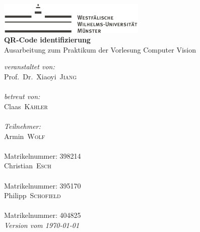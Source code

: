 
\begin{titlepage}
\begin{center}
\includegraphics[height=1.5cm, keepaspectratio]{images/Logo_WWU_Muenster.pdf} \\[1.0cm]
{\huge\sffamily\bfseries QR-Code identifizierung}\\[0.5cm]
{\large Ausarbeitung zum Praktikum der Vorlesung  Computer Vision}\\[3.0cm]
\end{center}

\begin{minipage}[b]{0.5\textwidth}
	{\large \textit{veranstaltet von:}}\\[5pt]
	{\Large Prof.\ Dr.\ Xiaoyi\ \textsc{Jiang}}\\[4pt]
	{}\\[.5cm] 

	{\large \textit{betreut von:}}\\[5pt]
	{\Large Claas\ \textsc{Kähler}}\\[4pt]
	{}\\[0.5cm] 

	{\large \textit{Teilnehmer:}}\\[5pt]
	{\Large Armin\ \textsc{Wolf}}\\[4pt]
    {}\\[4pt]
    {\large Matrikelnummer: 398214}\\[10pt]  
	{\Large Christian\ \textsc{Esch}}\\[4pt]
	{}\\[4pt]
	{\large Matrikelnummer: 395170}\\[10pt]	 
	{\Large Philipp\ \textsc{Schofield}}\\[4pt]
	{}\\[4pt] 
	{\large Matrikelnummer: 404825}\\[0.5cm]
	{\large\itshape Version vom \today}\\
\end{minipage}

\end{titlepage}

